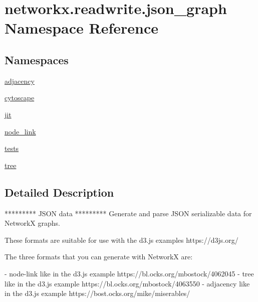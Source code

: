 \hypertarget{namespacenetworkx_1_1readwrite_1_1json__graph}{}\section{networkx.\+readwrite.\+json\+\_\+graph Namespace Reference}
\label{namespacenetworkx_1_1readwrite_1_1json__graph}
\subsection*{Namespaces}
\begin{DoxyCompactItemize}
\item 
 \hyperlink{namespacenetworkx_1_1readwrite_1_1json__graph_1_1adjacency}{adjacency}
\item 
 \hyperlink{namespacenetworkx_1_1readwrite_1_1json__graph_1_1cytoscape}{cytoscape}
\item 
 \hyperlink{namespacenetworkx_1_1readwrite_1_1json__graph_1_1jit}{jit}
\item 
 \hyperlink{namespacenetworkx_1_1readwrite_1_1json__graph_1_1node__link}{node\+\_\+link}
\item 
 \hyperlink{namespacenetworkx_1_1readwrite_1_1json__graph_1_1tests}{tests}
\item 
 \hyperlink{namespacenetworkx_1_1readwrite_1_1json__graph_1_1tree}{tree}
\end{DoxyCompactItemize}


\subsection{Detailed Description}
\begin{DoxyVerb}*********
JSON data
*********
Generate and parse JSON serializable data for NetworkX graphs.

These formats are suitable for use with the d3.js examples https://d3js.org/

The three formats that you can generate with NetworkX are:

 - node-link like in the d3.js example https://bl.ocks.org/mbostock/4062045
 - tree like in the d3.js example https://bl.ocks.org/mbostock/4063550
 - adjacency like in the d3.js example https://bost.ocks.org/mike/miserables/
\end{DoxyVerb}
 